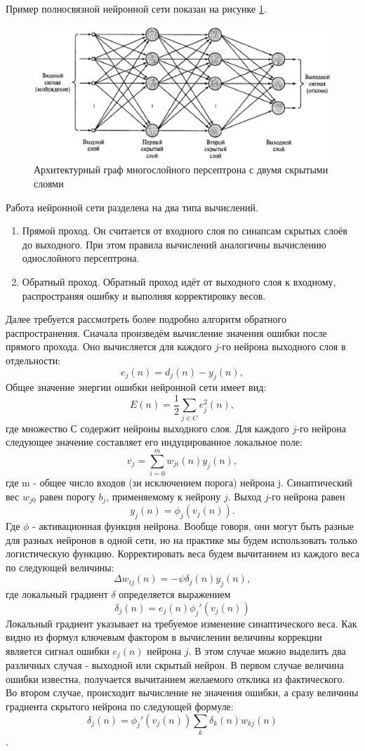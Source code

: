 \documentclass[oneside,final,14pt]{extreport}
\begin{document}
Пример полносвязной нейронной сети показан на рисунке \ref{fig:NN}. 
\begin{figure}[t]
    \centering
    \includegraphics{NN.eps}
    \caption{Архитектурный граф многослойного персептрона с двумя скрытыми слоями}
    \label{fig:NN}
\end{figure}
Работа нейронной сети разделена на два типа вычислений.
\begin{enumerate}
    \item Прямой проход. Он считается от входного слоя по синапсам скрытых слоёв до выходного. При этом правила вычислений аналогичны вычислению однослойного персептрона.
    \item Обратный проход. Обратный проход идёт от выходного слоя к входному, распространяя ошибку и выполняя корректировку весов.
\end{enumerate}
Далее требуется рассмотреть более подробно алгоритм обратного распространения. Сначала произведём вычисление значения ошибки после прямого прохода. Оно вычисляется для каждого \(j\)-го нейрона выходного слоя в отдельности:
\[ e_j(n) = d_j(n) - y_j(n),\]
Общее значение энергии ошибки нейронной сети имеет вид:
\[ E(n) = \frac{1}{2}\sum_{j \in C}e^2_j(n),\]
где множество \(С\) содержит нейроны выходного слоя. Для каждого \(j\)-го нейрона следующее значение составляет его индуцированное локальное поле:
\[v_j = \sum^m_{i=0}w_{ji}(n)y_j(n),\]
где m - общее число входов (зи исключением порога) нейрона j. Синаптический вес \(w_{j0}\) равен порогу \(b_j\), применяемому к нейрону \(j\). Выход \(j\)-го нейрона равен
\[y_j(n) = \phi_j(v_j(n)).\]
Где \(\phi\) - активационная функция нейрона. Вообще говоря, они могут быть разные для разных нейронов в одной сети, но на практике мы будем использовать только логистическую функцию. Корректировать веса будем вычитанием из каждого веса по следующей величины:
\[\Delta w_{ij}(n) = - \psi \delta_j(n)y_j(n),\]
где локальный градиент \(\delta\) определяется выражением
\[\delta_j(n) = e_j(n)\phi_j'(v_j(n)) \]
Локальный градиент указывает на требуемое изменение синаптического веса. Как видно из формул ключевым фактором в вычислении величины коррекции является сигнал ошибки \(e_j(n)\) нейрона \(j\). В этом случае можно выделить два различных случая - выходной или скрытый нейрон. 
В первом случае величина ошибки известна, получается вычитанием желаемого отклика из фактического.
Во втором случае, происходит вычисление не значения ошибки, а сразу величины градиента скрытого нейрона по следующей формуле:
\[ \delta_j(n) = \phi_j'(v_j(n))\sum_k \delta_k(n)w_{kj}(n)\].
\end{document}
